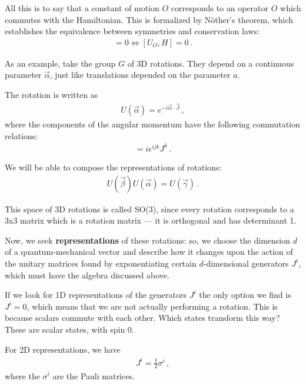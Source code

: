 \documentclass[main.tex]{subfiles}
\begin{document}
All this is to say that a constant of motion \(O\) corresponds to an operator \(O\) which commutes with the Hamiltonian. 
This is formalized by Nöther's theorem, which establishes the equivalence between symmetries and conservation laws:
%
\begin{align}
[O, H] = 0 
\iff 
[U_O, H] = 0
\,.
\end{align}

As an example, take the group \(G\) of 3D rotations. 
They depend on a continuous parameter \(\vec{\alpha}\), just like translations depended on the parameter \(a\). 

The rotation is written as 
%
\begin{align}
U(\vec{\alpha}) = e^{-i \vec{\alpha} \cdot \vec{J}}
\,,
\end{align}
%
where the components of the angular momentum have the following commutation relations: 
%
\begin{align}
[J^{i}, J^{j}] = i \epsilon^{ijk} J^{k}
\,.
\end{align}

We will be able to compose the representations of rotations: 
%
\begin{align}
U(\vec{\beta}) U(\vec{\alpha}) = U(\vec{\gamma})
\,.
\end{align}

This space of 3D rotations is called SO(3), since every rotation corresponds to a 3x3 matrix which is a rotation matrix --- it is orthogonal and has determinant 1.

Now, we seek \textbf{representations} of these rotations: so, we choose the dimension \(d\) of a quantum-mechanical vector and describe how it changes upon the action of the unitary matrices found by exponentiating certain \(d\)-dimensional generators \(J^{i}\), which must have the algebra discussed above. 

If we look for 1D representations of the generators \(J^{i}\) the only option we find is \(J^{i} = 0\), which means that we are not actually performing a rotation. This is because scalars commute with each other.
Which states transform this way? These are scalar states, with spin 0. 

For 2D representations, we have 
%
\begin{align}
J^{i} =\frac{1}{2} \sigma^{i} 
\,,
\end{align}
%
where the \(\sigma^{i}\) are the Pauli matrices.
\end{document}
